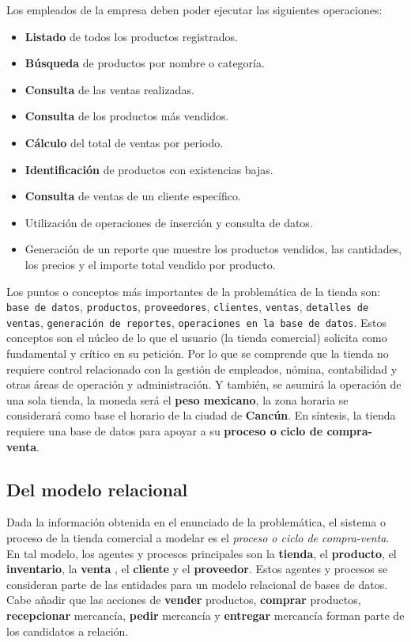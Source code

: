 \documentclass[11pt]{article}
\begin{document}
Los empleados de la empresa deben poder ejecutar las siguientes operaciones:

\begin{itemize}
    \item \textbf{Listado} de todos los productos registrados.
    \item \textbf{Búsqueda} de productos por nombre o categoría.
    \item \textbf{Consulta} de las ventas realizadas.
    \item \textbf{Consulta} de los productos más vendidos.
    \item \textbf{Cálculo} del total de ventas por periodo.
    \item \textbf{Identificación} de productos con existencias bajas.
    \item \textbf{Consulta} de ventas de un cliente específico.
    \item Utilización de operaciones de inserción y consulta de datos.
    \item Generación de un reporte que muestre los productos vendidos, las cantidades, los precios y el importe total vendido por producto.
\end{itemize}

Los puntos o conceptos más importantes de la problemática de la tienda son: \texttt{base de datos}, \texttt{productos}, \texttt{proveedores}, \texttt{clientes}, \texttt{ventas}, \texttt{detalles de ventas}, \texttt{generación de reportes}, \texttt{operaciones en la base de datos}. Estos conceptos son el núcleo de lo que el usuario (la tienda comercial) solicita como fundamental y crítico en su petición. Por lo que se comprende que la tienda no requiere control relacionado con la gestión de empleados, nómina, contabilidad y otras áreas de operación y administración. Y también, se asumirá la operación de una sola tienda, la moneda será el \textbf{peso mexicano}, la zona horaria se considerará como base el horario de la ciudad de \textbf{Cancún}. En síntesis, la tienda requiere una base de datos para apoyar a su \textbf{proceso o ciclo de compra-venta}. 

\subsection*{\centering Del modelo relacional}

Dada la información obtenida en el enunciado de la problemática, el sistema o proceso de la tienda comercial a modelar es el \textit{proceso o ciclo de compra-venta}. En tal modelo, los agentes y procesos principales son la \textbf{tienda}, el \textbf{producto}, el \textbf{inventario}, la \textbf{venta} , el \textbf{cliente} y el \textbf{proveedor}. Estos agentes y procesos se consideran parte de las entidades para un modelo relacional de bases de datos. Cabe añadir que las acciones de \textbf{vender} productos, \textbf{comprar} productos, \textbf{recepcionar} mercancía, \textbf{pedir} mercancía y \textbf{entregar} mercancía forman parte de los candidatos a relación.
\newline
\end{document}
